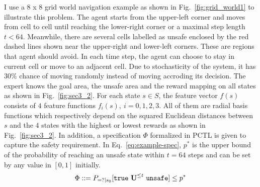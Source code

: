I use a 8 x 8 grid world navigation example as shown in Fig.~\ref{fig:grid_world1} to illustrate this problem. The agent starts from the upper-left corner and moves from cell to cell until reaching the lower-right corner or a maximal step length $t<64$. Meanwhile, there are several cells labelled as unsafe enclosed by the red dashed lines shown near the upper-right and lower-left corners. These are regions that agent should avoid. 
In each time step, the agent can choose to stay in current cell or move to an adjacent cell. Due to stochasticity of the system, it has $30\%$ chance of moving randomly instead of moving accroding its decision. 
The expert knows the goal area, the unsafe area and the reward mapping on all states as shown in Fig.~\ref{fig:sec3_2}. For each state $s\in S$, the feature vector $f(s)$ consists of $4$ feature functions $f_i(s),\ i = 0, 1, 2, 3$. All of them are radial basis functions which respectively depend on the squared Euclidean distances between $s$ and the $4$ states with the highest or lowest rewards as shown in Fig.~\ref{fig:sec3_2}. In addition, a specification $\Phi$ formalized in PCTL is given to capture the safety requirement. In Eq.~\ref{eq:example-spec}, $p^*$ is the upper bound of the probability of reaching an unsafe state within $t=64$ steps and can be set by any value in $[0, 1]$ initially.
\begin{equation}
\Phi ::= P_{=?|s_0}[\true\ \until^{\leq t}\ \texttt{unsafe}]\leq p^*
\label{eq:example-spec}
\end{equation}


